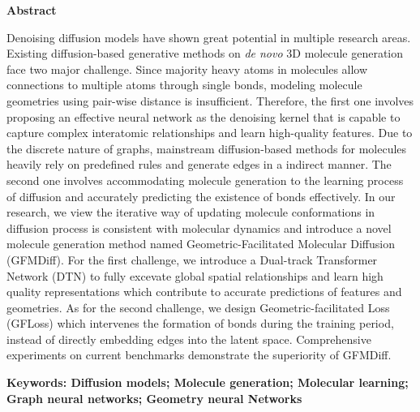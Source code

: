 \clearpage
{}
\begin{center}
    \textbf{ Abstract}
\end{center}
Denoising diffusion models have shown great potential in multiple research areas. Existing diffusion-based generative methods on {\itshape de novo} 3D molecule generation face two major challenge. Since majority heavy atoms in molecules allow connections to multiple atoms through single bonds, modeling molecule geometries using pair-wise distance is insufficient. Therefore, the first one involves proposing an effective neural network as the denoising kernel that is capable to capture complex interatomic relationships and learn high-quality features. Due to the discrete nature of graphs, mainstream diffusion-based methods for molecules heavily rely on predefined rules and generate edges in a indirect manner. The second one involves accommodating molecule generation to the learning process of diffusion and accurately predicting the existence of bonds effectively. In our research, we view the iterative way of updating molecule conformations in diffusion process is consistent with molecular dynamics and introduce a novel molecule generation method named Geometric-Facilitated Molecular Diffusion (GFMDiff). For the first challenge, we introduce a Dual-track Transformer Network (DTN) to fully excevate global spatial relationships and learn high quality representations which contribute to accurate predictions of features and geometries. As for the second challenge, we design Geometric-facilitated Loss (GFLoss) which intervenes the formation of bonds during the training period, instead of directly embedding edges into the latent space. Comprehensive experiments on current benchmarks demonstrate the superiority of GFMDiff.

\vspace{20pt}
\noindent \textbf{Keywords: Diffusion models; Molecule generation; Molecular learning; Graph neural networks; Geometry neural Networks}
\clearpage

\tableofcontents

\begingroup
    \renewcommand*{\addvspace}[1]{}
    \cleardoublepage
    \marklof
    \listoffigures

    \cleardoublepage
    \marklot
    \listoftables
\endgroup

